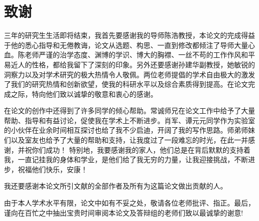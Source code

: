 \chapter*{致\quad 谢}


三年的研究生生活即将结束，我首先要感谢我的导师陈浩教授，本论文的完成得益于他的悉心指导和无倦教诲，论文从选题、构思、一直到修改都倾注了导师大量心血。陈老师严谨的治学态度、渊博的学识、博大的胸襟、一丝不苟的工作作风和平易近人的性格，都给我留下了深刻的印象。另外还要感谢孙建华副教授，她敏锐的洞察力以及对学术研究的极大热情令人敬佩。两位老师提倡的学术自由极大的激发了我们的研究热情和创新欲望，使我的科研水平以及综合素质得到提高。在论文完成之际，特向他们致以诚挚的敬意和衷心的感谢。

在论文的创作中还得到了许多同学的倾心帮助。常诚师兄在论文工作中给予了大量帮助、指导和有益讨论，促使我在学术上不断进步。肖军、谭元元同学作为实验室的小伙伴在业余时间相互探讨也给了我不少启迪，开阔了我的写作思路。师弟师妹们以及室友也给予了大量的帮助和支持，让我度过了一段难忘的时光，在此一并感谢，并祝你们成功！ 
特别地，我要感谢我的家人，他们总是在背后默默的支持着我，一直记挂我的身体和学业，是他们给了我无穷的力量，让我迎接挑战，不断进步，祝福他们快乐，安康！ 

我还要感谢本论文所引文献的全部作者及所有为这篇论文做出贡献的人。

由于本人学术水平有限，论文中如有不妥之处，敬请各位老师批评、指正。最后，谨向在百忙之中抽出宝贵时间审阅本论文及答辩组的老师们致以最诚挚的谢意!

